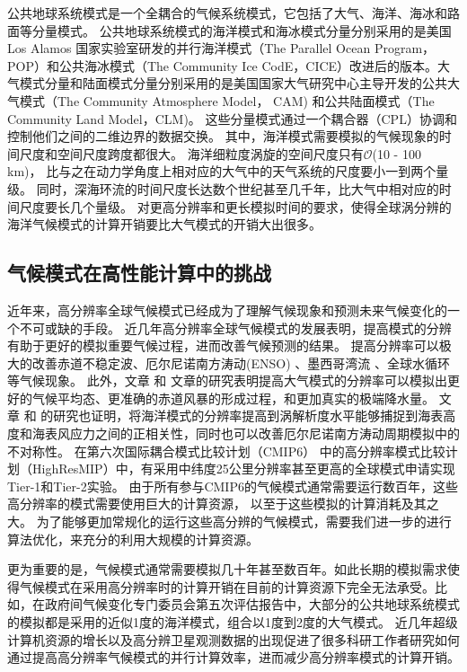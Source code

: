 公共地球系统模式是一个全耦合的气候系统模式，它包括了大气、海洋、海冰和路面等分量模式。
公共地球系统模式的海洋模式和海冰模式分量分别采用的是美国Los Alamos 国家实验室研发的并行海洋模式（The Parallel Ocean Program，POP）和公共海冰模式（The Community Ice CodE，CICE）改进后的版本。大气模式分量和陆面模式分量分别采用的是美国国家大气研究中心主导开发的公共大气模式（The Community Atmosphere Model， CAM) 和公共陆面模式（The Community Land Model，CLM)。 这些分量模式通过一个耦合器（CPL）协调和控制他们之间的二维边界的数据交换。
其中，海洋模式需要模拟的气候现象的时间尺度和空间尺度跨度都很大。 
海洋细粒度涡旋的空间尺度只有$\mathcal{O}$(10 - 100 km)， 比与之在动力学角度上相对应的大气中的天气系统的尺度要小一到两个量级。
同时，深海环流的时间尺度长达数个世纪甚至几千年，比大气中相对应的时间尺度要长几个量级。
对更高分辨率和更长模拟时间的要求，使得全球涡分辨的海洋气候模式的计算开销要比大气模式的开销大出很多\cite{bryan2010frontal,mcclean2011prototype,graham2014importance}。
 


 

\subsection{气候模式在高性能计算中的挑战}

近年来，高分辨率全球气候模式已经成为了理解气候现象和预测未来气候变化的一个不可或缺的手段。
近几年高分辨率全球气候模式的发展表明，提高模式的分辨有助于更好的模拟重要气候过程，进而改善气候预测的结果。
提高分辨率可以极大的改善赤道不稳定波\citep{roberts2009impact}、厄尔尼诺南方涛动(ENSO) \citep{shaffrey2009uk}、墨西哥湾流\citep{chassignet2008gulf, kuwano2010precipitation} 、全球水循环\citep{demory2014role}等气候现象。
此外，文章 和 文章的研究表明提高大气模式的分辨率可以模拟出更好的气候平均态、更准确的赤道风暴的形成过程，和更加真实的极端降水量。
文章 和 的研究也证明，将海洋模式的分辨率提高到涡解析度水平能够捕捉到海表高度和海表风应力之间的正相关性，同时也可以改善厄尔尼诺南方涛动周期模拟中的不对称性。
在第六次国际耦合模式比较计划（CMIP6） 中的高分辨率模式比较计划（HighResMIP）中，有采用中纬度25公里分辨率甚至更高的全球模式申请实现Tier-1和Tier-2实验。 
由于所有参与CMIP6的气候模式通常需要运行数百年，这些高分辨率的模式需要使用巨大的计算资源， 以至于这些模拟的计算消耗及其之大。
为了能够更加常规化的运行这些高分辨的气候模式，需要我们进一步的进行算法优化，来充分的利用大规模的计算资源。

更为重要的是，气候模式通常需要模拟几十年甚至数百年。如此长期的模拟需求使得气候模式在采用高分辨率时的计算开销在目前的计算资源下完全无法承受。比如，在政府间气候变化专门委员会第五次评估报告中，大部分的公共地球系统模式的模拟都是采用的近似1度的海洋模式，组合以1度到2度的大气模式。
近几年超级计算机资源的增长以及高分辨卫星观测数据的出现促进了很多科研工作者研究如何通过提高高分辨率气候模式的并行计算效率，进而减少高分辨率模式的计算开销。

